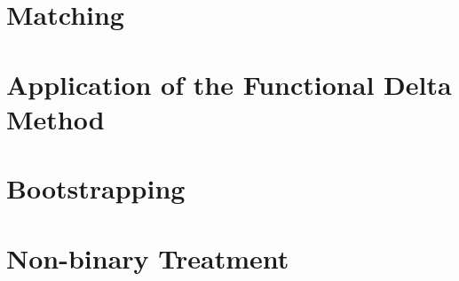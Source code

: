 \section{Matching}
  
\section{Application of the Functional Delta Method}
  
\section{Bootstrapping} 
  
\section{Non-binary Treatment}
  
